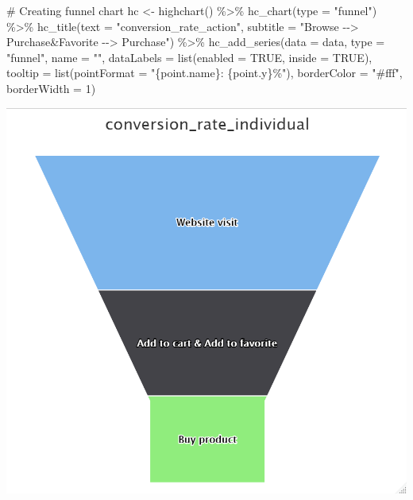 \documentclass[
  11pt,
]{article}
\newenvironment{Shaded}{\begin{snugshade}}{\end{snugshade}}
\newcommand{\AttributeTok}[1]{\textcolor[rgb]{0.40,0.45,0.13}{#1}}
\newcommand{\CommentTok}[1]{\textcolor[rgb]{0.37,0.37,0.37}{#1}}
\newcommand{\ConstantTok}[1]{\textcolor[rgb]{0.56,0.35,0.01}{#1}}
\newcommand{\DecValTok}[1]{\textcolor[rgb]{0.68,0.00,0.00}{#1}}
\newcommand{\FunctionTok}[1]{\textcolor[rgb]{0.28,0.35,0.67}{#1}}
\newcommand{\NormalTok}[1]{\textcolor[rgb]{0.00,0.23,0.31}{#1}}
\newcommand{\OtherTok}[1]{\textcolor[rgb]{0.00,0.23,0.31}{#1}}
\newcommand{\SpecialCharTok}[1]{\textcolor[rgb]{0.37,0.37,0.37}{#1}}
\newcommand{\StringTok}[1]{\textcolor[rgb]{0.13,0.47,0.30}{#1}}
\begin{document}
\begin{Shaded}
\begin{Highlighting}[]
\CommentTok{\# Creating funnel chart}
\NormalTok{hc }\OtherTok{\textless{}{-}} \FunctionTok{highchart}\NormalTok{() }\SpecialCharTok{\%\textgreater{}\%}
  \FunctionTok{hc\_chart}\NormalTok{(}\AttributeTok{type =} \StringTok{"funnel"}\NormalTok{) }\SpecialCharTok{\%\textgreater{}\%}
  \FunctionTok{hc\_title}\NormalTok{(}\AttributeTok{text =} \StringTok{"conversion\_rate\_action"}\NormalTok{,}
           \AttributeTok{subtitle =} \StringTok{"Browse {-}{-}\textgreater{} Purchase\&Favorite {-}{-}\textgreater{} Purchase"}\NormalTok{) }\SpecialCharTok{\%\textgreater{}\%}
  \FunctionTok{hc\_add\_series}\NormalTok{(}\AttributeTok{data =}\NormalTok{ data,}
                \AttributeTok{type =} \StringTok{"funnel"}\NormalTok{,}
                \AttributeTok{name =} \StringTok{""}\NormalTok{,}
                \AttributeTok{dataLabels =} \FunctionTok{list}\NormalTok{(}\AttributeTok{enabled =} \ConstantTok{TRUE}\NormalTok{, }\AttributeTok{inside =} \ConstantTok{TRUE}\NormalTok{),}
                \AttributeTok{tooltip =} \FunctionTok{list}\NormalTok{(}\AttributeTok{pointFormat =} \StringTok{"\{point.name\}: \{point.y\}\%"}\NormalTok{),}
                \AttributeTok{borderColor =} \StringTok{"\#fff"}\NormalTok{,}
                \AttributeTok{borderWidth =} \DecValTok{1}\NormalTok{)}
\end{Highlighting}
\end{Shaded}

\includegraphics{img/funnel2.png}
\end{document}
